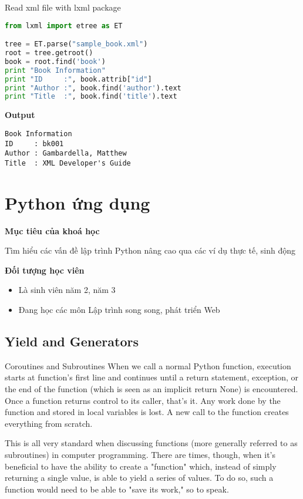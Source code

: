 Read xml file with lxml package

\begin{lstlisting}[language=Python]
from lxml import etree as ET

tree = ET.parse("sample_book.xml")
root = tree.getroot()
book = root.find('book')
print "Book Information"
print "ID     :", book.attrib["id"]
print "Author :", book.find('author').text
print "Title  :", book.find('title').text
\end{lstlisting}

\textbf{Output}

\begin{lstlisting}
Book Information
ID     : bk001
Author : Gambardella, Matthew
Title  : XML Developer's Guide
\end{lstlisting}

\chapter{Python ứng dụng}

\textbf{Mục tiêu của khoá học}

Tìm hiểu các vấn đề lập trình Python nâng cao qua các ví dụ thực tế, sinh động

\textbf{Đối tượng học viên}

\begin{itemize}
  \item Là sinh viên năm 2, năm 3
  \item Đang học các môn Lập trình song song, phát triển Web
\end{itemize}

\section{Yield and Generators}

Coroutines and Subroutines
When we call a normal Python function, execution starts at function's first line and continues until a return statement, exception, or the end of the function (which is seen as an implicit return None) is encountered. Once a function returns control to its caller, that's it. Any work done by the function and stored in local variables is lost. A new call to the function creates everything from scratch.

This is all very standard when discussing functions (more generally referred to as subroutines) in computer programming. There are times, though, when it's beneficial to have the ability to create a "function" which, instead of simply returning a single value, is able to yield a series of values. To do so, such a function would need to be able to "save its work," so to speak.

